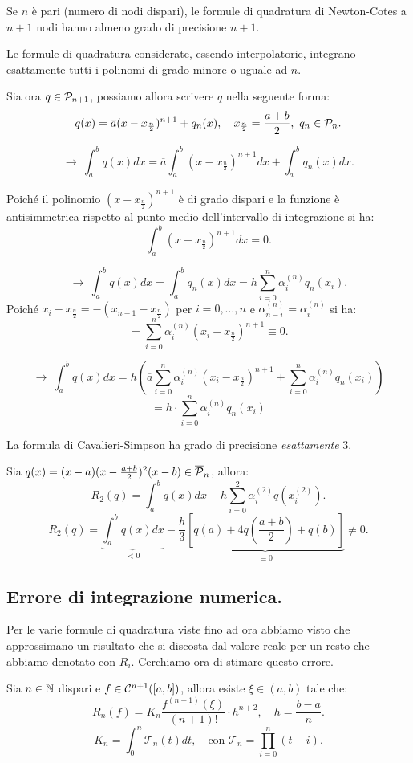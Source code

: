 \begin{prop}
Se $n$ è pari (numero di nodi dispari), le formule di quadratura di
Newton-Cotes a $n+1$ nodi hanno almeno grado di precisione $n+1$.
\end{prop}
\begin{dimo}
Le formule di quadratura considerate, essendo interpolatorie, integrano
esattamente tutti i polinomi di grado minore o uguale ad $n$.

Sia ora $q \in \mathcal{P}_{n+1}$, possiamo allora scrivere $q$ nella seguente forma:
\[q(x) =\overline{a} (x-x_{\frac{n}{2}})^{n+1} + q_n(x), \quad x_{\frac{n}{2}}=
\frac{a+b}{2}, \ q_n \in \mathcal{P}_n.\]

\[\longrightarrow \
\int_a^bq(x)dx = \overline{a}\int_a^b(x-x_{\frac{n}{2}})^{n+1}dx + \int_a^bq_n(x)dx
.\]

Poiché il polinomio $(x-x_{\frac{n}{2}})^{n+1}$ è di grado dispari e la funzione
è antisimmetrica rispetto al punto medio dell'intervallo di integrazione si 
ha:
\[\int_a^b(x-x_{\frac{n}{2}})^{n+1}dx = 0.\]

\[\longrightarrow \
\int_a^bq(x)dx = \int_a^bq_n(x)dx = h\sum_{i=0}^n\alpha_i^{(n)}q_n(x_i).\]
Poiché $x_i - x_{\frac{n}{2}} = -(x_{n-1} - x_{\frac{n}{2}})$ per $i=0,\ldots,n$ e
$\alpha_{n-i}^{(n)} = \alpha_i^{(n)}$ si ha:
\[
= \sum_{i=0}^n\alpha_i^{(n)}(x_i - x_{\frac{n}{2}})^{n+1} \equiv 0.
\]

\[\longrightarrow \
\int_a^bq(x)dx = h \left(\overline{a}\sum_{i=0}^n\alpha_i^{(n)}(x_i - 
x_{\frac{n}{2}})^{n+1} + \sum_{i=0}^n\alpha_i^{(n)}q_n(x_i)\right)
\]
\[
= h \cdot \sum_{i=0}^n\alpha_i^{(n)}q_n(x_i)
\]
\end{dimo}

\begin{prop}
La formula di Cavalieri-Simpson ha grado di precisione \emph{esattamente} $3$.
\end{prop}
\begin{dimo}
Sia $q(x) = (x-a)(x-\frac{a+b}{2})^2(x-b) \in \overline{\mathcal{P}}_n$, allora:
\[
R_2(q) = \int_a^bq(x)dx - h \sum_{i=0}^2\alpha_i^{(2)}q(x_i^{(2)}).
\]
\[
R_2(q) = \underbrace{\int_a^bq(x)dx}_{< 0} - \frac{h}{3} \underbrace{
\left[q(a)+ 4q(\frac{a+b}{2})+ q(b)\right]}_{\equiv 0} \neq 0.
\]
\end{dimo}

\subsection{Errore di integrazione numerica.}
Per le varie formule di quadratura viste fino ad ora abbiamo visto che
approssimano un risultato che si discosta dal valore reale per un resto che 
abbiamo denotato con $R_i$. Cerchiamo ora di stimare questo errore.
\begin{teo}
Sia $n \in \mathbb{N}$ dispari e $f \in \mathcal{C}^{n+1}([a,b])$, allora esiste $\xi \in 
(a,b)$ tale che:
\[ R_n(f) = K_n \frac{f^{(n+1)}(\xi)}{(n+1)!}
\cdot h^{n+2}, \quad h = \frac{b-a}{n}.\]
\[K_n = \int_0^n \mathcal{T}_n(t)dt, \quad 
\textrm{con } \mathcal{T}_n = \prod_{i=0}^n(t-i).\] 
\end{teo}

